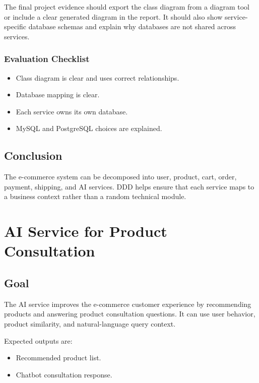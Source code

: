 \documentclass[12pt,a4paper]{article}
\begin{document}
The final project evidence should export the class diagram from a diagram tool or include a clear generated diagram in the report. It should also show service-specific database schemas and explain why databases are not shared across services.

\subsubsection{Evaluation Checklist}

\begin{itemize}
    \item Class diagram is clear and uses correct relationships.
    \item Database mapping is clear.
    \item Each service owns its own database.
    \item MySQL and PostgreSQL choices are explained.
\end{itemize}

\subsection{Conclusion}

The e-commerce system can be decomposed into user, product, cart, order, payment, shipping, and AI services. DDD helps ensure that each service maps to a business context rather than a random technical module.

\section{AI Service for Product Consultation}

\subsection{Goal}

The AI service improves the e-commerce customer experience by recommending products and answering product consultation questions. It can use user behavior, product similarity, and natural-language query context.

Expected outputs are:

\begin{itemize}
    \item Recommended product list.
    \item Chatbot consultation response.
\end{itemize}
\end{document}

